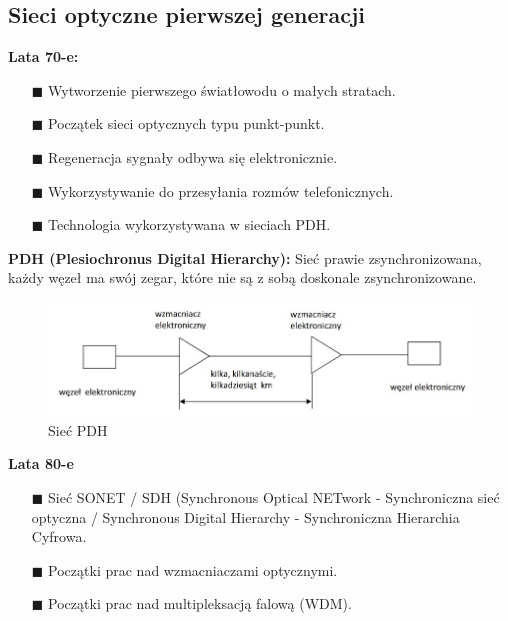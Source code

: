 \documentclass{article}
\begin{document}
\subsection{Sieci optyczne pierwszej generacji}
\textbf{Lata 70-e:}
\begin{enumerate}
    \item[$\blacksquare$] Wytworzenie pierwszego światłowodu o małych stratach.
    \item[$\blacksquare$] Początek sieci optycznych typu punkt-punkt.
    \item[$\blacksquare$] Regeneracja sygnały odbywa się elektronicznie.
    \item[$\blacksquare$] Wykorzystywanie do przesyłania rozmów telefonicznych.
    \item[$\blacksquare$] Technologia wykorzystywana w sieciach PDH.
\end{enumerate}
\textbf{PDH (Plesiochronus Digital Hierarchy):} Sieć prawie zsynchronizowana, każdy węzeł ma swój zegar, które nie są z sobą doskonale zsynchronizowane.
\begin{figure}
    \centering
    \includegraphics[width=0.7\linewidth]{w02z02.jpg}
    \caption{Sieć PDH}
\end{figure}
\newpage
\textbf{Lata 80-e}
\begin{enumerate}
    \item[$\blacksquare$] Sieć SONET / SDH (Synchronous Optical NETwork - Synchroniczna sieć optyczna / Synchronous Digital Hierarchy - Synchroniczna Hierarchia Cyfrowa.
    \item[$\blacksquare$] Początki prac nad wzmacniaczami optycznymi.
    \item[$\blacksquare$] Początki prac nad multipleksacją falową (WDM).
\end{enumerate}
\end{document}
